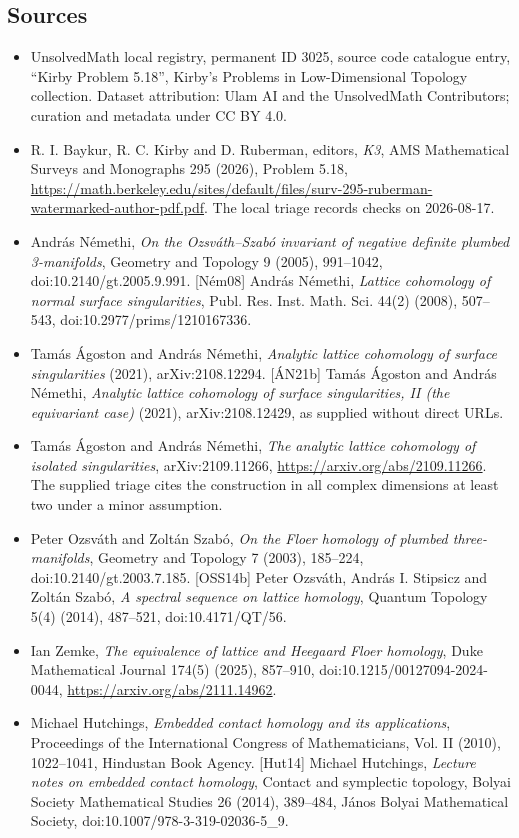 \documentclass[11pt]{article}
\begin{document}
\subsection{Sources}
\begin{itemize}
\item UnsolvedMath local registry, permanent ID 3025, source code catalogue entry, ``Kirby Problem 5.18'', Kirby's Problems in Low-Dimensional Topology collection. Dataset attribution: Ulam AI and the UnsolvedMath Contributors; curation and metadata under CC BY 4.0.
\item R. I. Baykur, R. C. Kirby and D. Ruberman, editors, \emph{K3}, AMS Mathematical Surveys and Monographs 295 (2026), Problem 5.18, \url{https://math.berkeley.edu/sites/default/files/surv-295-ruberman-watermarked-author-pdf.pdf}. The local triage records checks on 2026-08-17.
\item [Ném05] András Némethi, \emph{On the Ozsváth--Szabó invariant of negative definite plumbed 3-manifolds}, Geometry and Topology 9 (2005), 991--1042, doi:10.2140/gt.2005.9.991. [Ném08] András Némethi, \emph{Lattice cohomology of normal surface singularities}, Publ. Res. Inst. Math. Sci. 44(2) (2008), 507--543, doi:10.2977/prims/1210167336.
\item [ÁN21a] Tamás Ágoston and András Némethi, \emph{Analytic lattice cohomology of surface singularities} (2021), arXiv:2108.12294. [ÁN21b] Tamás Ágoston and András Némethi, \emph{Analytic lattice cohomology of surface singularities, II (the equivariant case)} (2021), arXiv:2108.12429, as supplied without direct URLs.
\item Tamás Ágoston and András Némethi, \emph{The analytic lattice cohomology of isolated singularities}, arXiv:2109.11266, \url{https://arxiv.org/abs/2109.11266}. The supplied triage cites the construction in all complex dimensions at least two under a minor assumption.
\item [OS03b] Peter Ozsváth and Zoltán Szabó, \emph{On the Floer homology of plumbed three-manifolds}, Geometry and Topology 7 (2003), 185--224, doi:10.2140/gt.2003.7.185. [OSS14b] Peter Ozsváth, András I. Stipsicz and Zoltán Szabó, \emph{A spectral sequence on lattice homology}, Quantum Topology 5(4) (2014), 487--521, doi:10.4171/QT/56.
\item [Zem25] Ian Zemke, \emph{The equivalence of lattice and Heegaard Floer homology}, Duke Mathematical Journal 174(5) (2025), 857--910, doi:10.1215/00127094-2024-0044, \url{https://arxiv.org/abs/2111.14962}.
\item [Hut10] Michael Hutchings, \emph{Embedded contact homology and its applications}, Proceedings of the International Congress of Mathematicians, Vol. II (2010), 1022--1041, Hindustan Book Agency. [Hut14] Michael Hutchings, \emph{Lecture notes on embedded contact homology}, Contact and symplectic topology, Bolyai Society Mathematical Studies 26 (2014), 389--484, János Bolyai Mathematical Society, doi:10.1007/978-3-319-02036-5\_9.

\end{itemize}
\end{document}
